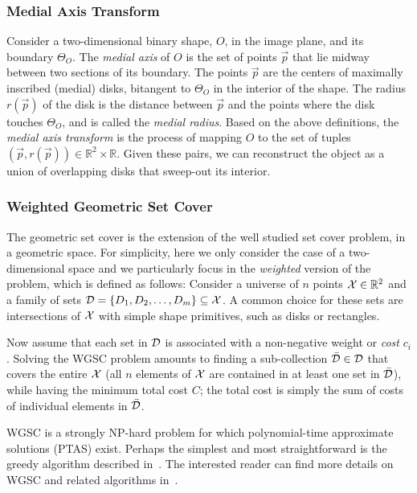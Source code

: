 \documentclass[10pt,twocolumn,letterpaper]{article}
\begin{document}
\subsubsection*{Medial Axis Transform}
Consider a two-dimensional binary shape, $O$, in the image plane, and its boundary $\Theta_O$.
The \emph{medial axis} of $O$ is the set of points $\vec{p}$ that lie midway between two sections of 
its boundary. The points $\vec{p}$ are the centers of maximally inscribed (medial) disks, bitangent to $\Theta_O$
in the interior of the shape. The radius $r(\vec{p})$ of the disk is the distance between $\vec{p}$ and 
the points where the disk touches $\Theta_O$, and is called the \emph{medial radius}.
Based on the above definitions, the \emph{medial axis transform} is the process of 
mapping $O$ to the set of tuples $(\vec{p},r(\vec{p})) \in \mathbb{R}^2 \times \mathbb{R}$.
Given these pairs, we can reconstruct the object as a union of overlapping disks that sweep-out 
its interior. 

\subsubsection*{Weighted Geometric Set Cover}
The geometric set cover is the extension of the well studied set cover problem, in a geometric space.
For simplicity, here we only consider the case of a two-dimensional space and we particularly focus in the 
\emph{weighted} version of the problem, which is defined as follows:
Consider a universe of $n$ points $\mathcal{X} \in \mathbb{R}^2$ and a family of sets 
$\mathcal{D} = \{D_1,D_2,\ldots,D_m\} \subseteq \mathcal{X}$. 
A common choice for these sets are intersections of $\mathcal{X}$ with simple shape primitives, such as disks or rectangles.

Now assume that each set in $\mathcal{D}$ is associated with a non-negative weight or \emph{cost} $c_i$.
Solving the WGSC problem amounts to finding a sub-collection $\bar{\mathcal{D}} \in \mathcal{D}$ that covers the entire $\mathcal{X}$
(all $n$ elements of $\mathcal{X}$ are contained in at least one set in $\bar{\mathcal{D}}$), while having the minimum
total cost $C$; the total cost is simply the sum of costs of individual elements in $\bar{\mathcal{D}}$.

WGSC is a strongly NP-hard problem for which polynomial-time approximate solutions (PTAS) exist.
Perhaps the simplest and most straightforward is the greedy algorithm described in~\cite{vazirani2013approximation}. 
The interested reader can find more details on WGSC and related algorithms in~\cite{mustafa2015quasi,varadarajan2010weighted,har2012weighted,chan2012weighted}.
\end{document}
